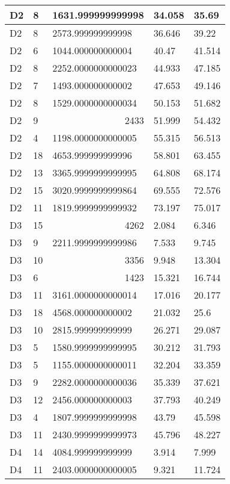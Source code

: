 \begin{longtable}{|l|l|l|l|l|}
D2 & 8 & 1631.999999999998 & 34.058 & 35.69 \\ \hline
D2 & 8 & 2573.999999999998 & 36.646 & 39.22 \\ \hline
D2 & 6 & 1044.000000000004 & 40.47 & 41.514 \\ \hline
D2 & 8 & 2252.0000000000023 & 44.933 & 47.185 \\ \hline
D2 & 7 & 1493.000000000002 & 47.653 & 49.146 \\ \hline
D2 & 8 & 1529.0000000000034 & 50.153 & 51.682 \\ \hline
D2 & 9 & \multicolumn{1}{r|}{2433} & 51.999 & 54.432 \\ \hline
D2 & 4 & 1198.0000000000005 & 55.315 & 56.513 \\ \hline
D2 & 18 & 4653.999999999996 & 58.801 & 63.455 \\ \hline
D2 & 13 & 3365.9999999999995 & 64.808 & 68.174 \\ \hline
D2 & 15 & 3020.9999999999864 & 69.555 & 72.576 \\ \hline
D2 & 11 & 1819.9999999999932 & 73.197 & 75.017 \\ \hline
D3 & 15 & \multicolumn{1}{r|}{4262} & 2.084 & 6.346 \\ \hline
D3 & 9 & 2211.9999999999986 & 7.533 & 9.745 \\ \hline
D3 & 10 & \multicolumn{1}{r|}{3356} & 9.948 & 13.304 \\ \hline
D3 & 6 & \multicolumn{1}{r|}{1423} & 15.321 & 16.744 \\ \hline
D3 & 11 & 3161.0000000000014 & 17.016 & 20.177 \\ \hline
D3 & 18 & 4568.000000000002 & 21.032 & 25.6 \\ \hline
D3 & 10 & 2815.999999999999 & 26.271 & 29.087 \\ \hline
D3 & 5 & 1580.9999999999995 & 30.212 & 31.793 \\ \hline
D3 & 5 & 1155.0000000000011 & 32.204 & 33.359 \\ \hline
D3 & 9 & 2282.0000000000036 & 35.339 & 37.621 \\ \hline
D3 & 12 & 2456.000000000003 & 37.793 & 40.249 \\ \hline
D3 & 4 & 1807.9999999999998 & 43.79 & 45.598 \\ \hline
D3 & 11 & 2430.9999999999973 & 45.796 & 48.227 \\ \hline
D4 & 14 & 4084.999999999999 & 3.914 & 7.999 \\ \hline
D4 & 11 & 2403.0000000000005 & 9.321 & 11.724 \\ \hline

\end{longtable}
